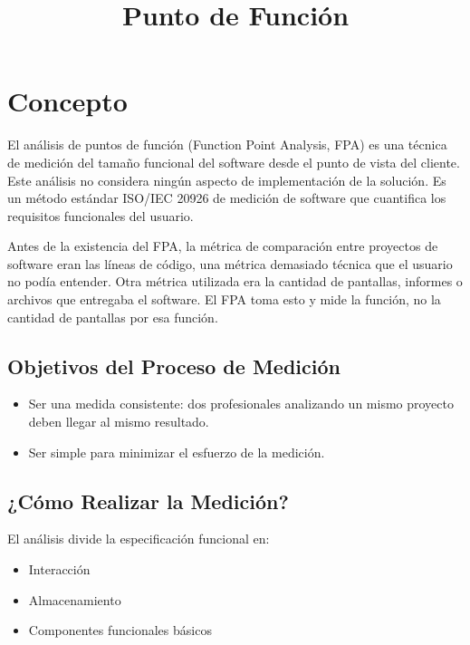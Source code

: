 \documentclass{article}
\title{Punto de Función}
\author{}
\date{}
\begin{document}
\maketitle

\section{Concepto}
El análisis de puntos de función (Function Point Analysis, FPA) es una técnica de medición del tamaño funcional del software desde el punto de vista del cliente. Este análisis no considera ningún aspecto de implementación de la solución.\cite{jones1996function} Es un método estándar ISO/IEC 20926 de medición de software que cuantifica los requisitos funcionales del usuario.\cite{pressman2005software}


Antes de la existencia del FPA, la métrica de comparación entre proyectos de software eran las líneas de código, una métrica demasiado técnica que el usuario no podía entender. Otra métrica utilizada era la cantidad de pantallas, informes o archivos que entregaba el software. El FPA toma esto y mide la función, no la cantidad de pantallas por esa función.\cite{wiki}

\subsection{Objetivos del Proceso de Medición}
\begin{itemize}
    \item Ser una medida consistente: dos profesionales analizando un mismo proyecto deben llegar al mismo resultado.
    \item Ser simple para minimizar el esfuerzo de la medición.
\end{itemize}

\subsection{¿Cómo Realizar la Medición?}
El análisis divide la especificación funcional en:
\begin{itemize}
    \item Interacción
    \item Almacenamiento
    \item Componentes funcionales básicos
\end{itemize}
\end{document}

